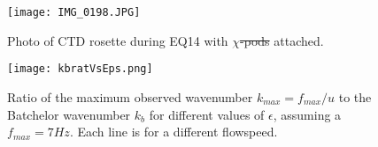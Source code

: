 \documentclass{ametsoc}
\providecommand{\DIFadd}[1]{{\protect\color{blue}\uwave{#1}}} %
\providecommand{\DIFdel}[1]{{\protect\color{red}\sout{#1}}}                      %
\providecommand{\DIFaddFL}[1]{\DIFadd{#1}} %
\providecommand{\DIFdelFL}[1]{\DIFdel{#1}} %
\providecommand{\DIFaddbeginFL}{} %
\providecommand{\DIFaddendFL}{} %
\providecommand{\DIFdelbeginFL}{} %
\providecommand{\DIFdelendFL}{} %
\begin{document}
%

%

\graphicspath{
{/Users/Andy/Cruises_Research/ChiPod/ChiPod_Methods_Paper/figures/}
}

\begin{figure}[t]
  \noindent\texttt{[image: IMG\_0198.JPG]}\\
  \caption{Photo of CTD rosette during EQ14 with $\chi$\DIFdelbeginFL \DIFdelFL{-pods }\DIFdelendFL \DIFaddbeginFL \DIFaddFL{pods }\DIFaddendFL attached.}
  \label{f1}
\end{figure}


\begin{figure}[t]
  \noindent\texttt{[image: kbratVsEps.png]}\\
  \caption{Ratio of the maximum observed wavenumber $k_{max}=f_{max}/u$ to the Batchelor wavenumber $k_b$ for different values of $\epsilon$, assuming a $f_{max}=7Hz$. Each line is for a different flowspeed.}
  \label{kbratVseps}
\end{figure}
\end{document}
